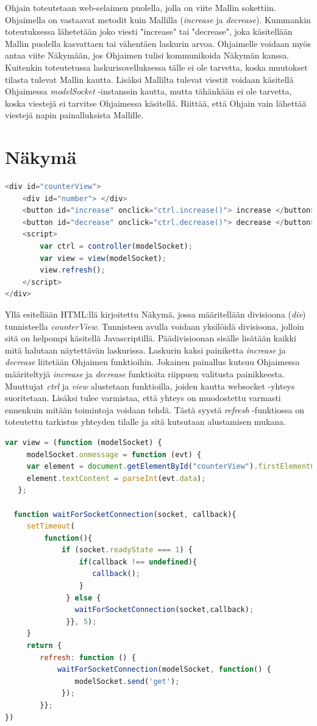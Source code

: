 \documentclass[utf8]{gradu3}
\begin{document}
Ohjain toteutetaan web-selaimen puolella, jolla on viite Mallin sokettiin. Ohjaimella on vastaavat metodit kuin Mallilla (\emph{increase} ja \emph{decrease}). Kummankin toteutuksessa lähetetään joko viesti "increase" tai "decrease", joka käsitellään Mallin puolella kasvattaen tai vähentäen laskurin arvoa. Ohjaimelle voidaan myös antaa viite Näkymään, jos Ohjaimen tulisi kommunikoida Näkymän kanssa. Kuitenkin toteutetussa laskurisovelluksessa tälle ei ole tarvetta, koska muutokset tilasta tulevat Mallin kautta. Lisäksi Mallilta tulevat viestit voidaan käsitellä Ohjaimessa \emph{modelSocket} -instanssin kautta, mutta tähänkään ei ole tarvetta, koska viestejä ei tarvitse Ohjaimessa käsitellä. Riittää, että Ohjain vain lähettää viestejä napin painalluksista Mallille.


\section{Näkymä}

\begin{lstlisting}[language=Javascript]
<div id="counterView">
    <div id="number"> </div>
    <button id="increase" onclick="ctrl.increase()"> increase </button>
    <button id="decrease" onclick="ctrl.decrease()"> decrease </button>
    <script>
        var ctrl = controller(modelSocket);
        var view = view(modelSocket);
        view.refresh();
    </script>
</div>
\end{lstlisting}

Yllä esitellään HTML:llä kirjoitettu Näkymä, jossa määritellään divisioona (\emph{div}) tunnisteella \emph{counterView}. Tunnisteen avulla voidaan yksilöidä divisioona, jolloin sitä on helpompi käsitellä Javascriptillä. Päädivisioonan sisälle lisätään kaikki mitä halutaan  näytettävän laskurissa. Laskurin kaksi painiketta \emph{increase} ja \emph{decrease} liitetään Ohjaimen funktioihin. Jokainen painallus kutsuu Ohjaimessa määriteltyjä \emph{increase} ja \emph{decrease} funktioita riippuen valitusta painikkeesta. Muuttujat  \emph{ctrl} ja \emph{view} alustetaan funktioilla, joiden kautta websocket -yhteys suoritetaan. Lisäksi tulee varmistaa, että yhteys on muodostettu varmasti ennenkuin mitään toimintoja voidaan tehdä. Tästä syystä \emph{refresh} -funktiossa on toteutettu tarkistus yhteyden tilalle ja sitä kutsutaan alustamisen mukana.

\begin{lstlisting}[language=Javascript]
var view = (function (modelSocket) {
     modelSocket.onmessage = function (evt) {
     var element = document.getElementById("counterView").firstElementChild;
     element.textContent = parseInt(evt.data);
   };

  function waitForSocketConnection(socket, callback){
     setTimeout(
         function(){
             if (socket.readyState === 1) {
                 if(callback !== undefined){
                    callback();
                 }
              } else {
                waitForSocketConnection(socket,callback);
              }}, 5);
     }
     return {
        refresh: function () {
            waitForSocketConnection(modelSocket, function() {
                modelSocket.send('get');
             });
        }};
})
\end{lstlisting}
\end{document}
